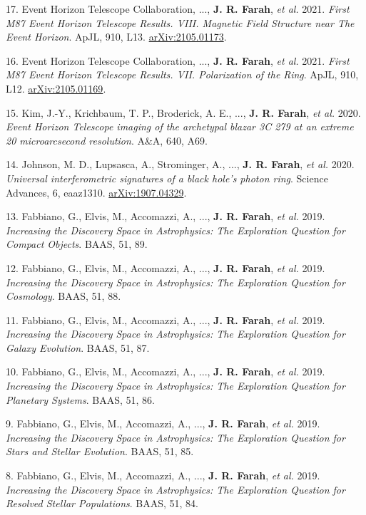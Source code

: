 \documentclass[margin,line]{res}
\newcommand{\apjl}{ApJL}                  %
\newcommand{\aap}{A\&A}                   %
\newcommand{\baas}{BAAS}                  %
\begin{document}
\begin{resume}
17. Event Horizon Telescope Collaboration, ..., \textbf{J. R. Farah}, \textit{et al.} 2021. \textit{First M87 Event Horizon Telescope Results. VIII. Magnetic Field Structure near The Event Horizon}. \apjl, 910, L13. \href{https://arxiv.org/abs/2105.01173}{arXiv:2105.01173}.

16. Event Horizon Telescope Collaboration, ..., \textbf{J. R. Farah}, \textit{et al.} 2021. \textit{First M87 Event Horizon Telescope Results. VII. Polarization of the Ring}. \apjl, 910, L12. \href{https://arxiv.org/abs/2105.01169}{arXiv:2105.01169}.

15. Kim, J.-Y., Krichbaum, T. P., Broderick, A. E., ..., \textbf{J. R. Farah}, \textit{et al.} 2020. \textit{Event Horizon Telescope imaging of the archetypal blazar 3C 279 at an extreme 20 microarcsecond resolution}. \aap, 640, A69.

14. Johnson, M. D., Lupsasca, A., Strominger, A., ..., \textbf{J. R. Farah}, \textit{et al.} 2020. \textit{Universal interferometric signatures of a black hole's photon ring}. Science Advances, 6, eaaz1310. \href{https://arxiv.org/abs/1907.04329}{arXiv:1907.04329}.

13. Fabbiano, G., Elvis, M., Accomazzi, A., ..., \textbf{J. R. Farah}, \textit{et al.} 2019. \textit{Increasing the Discovery Space in Astrophysics: The Exploration Question for Compact Objects}. \baas, 51, 89.

12. Fabbiano, G., Elvis, M., Accomazzi, A., ..., \textbf{J. R. Farah}, \textit{et al.} 2019. \textit{Increasing the Discovery Space in Astrophysics: The Exploration Question for Cosmology}. \baas, 51, 88.

11. Fabbiano, G., Elvis, M., Accomazzi, A., ..., \textbf{J. R. Farah}, \textit{et al.} 2019. \textit{Increasing the Discovery Space in Astrophysics: The Exploration Question for Galaxy Evolution}. \baas, 51, 87.

10. Fabbiano, G., Elvis, M., Accomazzi, A., ..., \textbf{J. R. Farah}, \textit{et al.} 2019. \textit{Increasing the Discovery Space in Astrophysics: The Exploration Question for Planetary Systems}. \baas, 51, 86.

9. Fabbiano, G., Elvis, M., Accomazzi, A., ..., \textbf{J. R. Farah}, \textit{et al.} 2019. \textit{Increasing the Discovery Space in Astrophysics: The Exploration Question for Stars and Stellar Evolution}. \baas, 51, 85.

8. Fabbiano, G., Elvis, M., Accomazzi, A., ..., \textbf{J. R. Farah}, \textit{et al.} 2019. \textit{Increasing the Discovery Space in Astrophysics: The Exploration Question for Resolved Stellar Populations}. \baas, 51, 84.


\end{resume}
\end{document}
